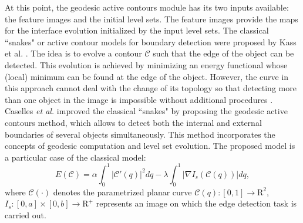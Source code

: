 At this point, the geodesic active contours module has its two inputs available: the feature images and the initial level sets.
The feature images provide the maps for the interface evolution initialized by the input level sets.
The classical ``snakes" or active contour models for boundary detection were proposed by Kass et al. \cite{Kass1988}.
The idea is to evolve a contour $\mathcal{C}$ such that the edge of the object can be detected.
This evolution is achieved by minimizing an energy functional whose (local) minimum can be found at the edge of the object.
\setlength{\arraycolsep}{5pt}
However, the curve in this approach cannot deal with the change of its topology so that detecting more than one object in the image is impossible without additional procedures \cite{Caselles1997}.
Caselles \textit{et al.} \cite{Caselles1997} improved the classical ``snakes" by proposing the geodesic active contours method, which allows to detect both the internal and external boundaries of several objects simultaneously.
This method incorporates the concepts of geodesic computation and level set evolution.
The proposed model is a particular case of the classical model:
\begin{equation}
\label{eqn:ParticularSnakes}
E(\mathcal{C}) = \alpha \int_0^1 | \mathcal{C}'(q) |^2 dq - \lambda \int_0^1 | \nabla I_{s} ( \mathcal{C}(q) ) |dq,
\end{equation}
where $\mathcal{C}(\cdot)$ denotes the parametrized planar curve $\mathcal{C}(q):[0,1]\rightarrow \mathrm{R}^2$, $I_{s}:[0,a]\times [0,b]\rightarrow \mathrm{R}^{+}$ represents an image on which the edge detection task is carried out.

